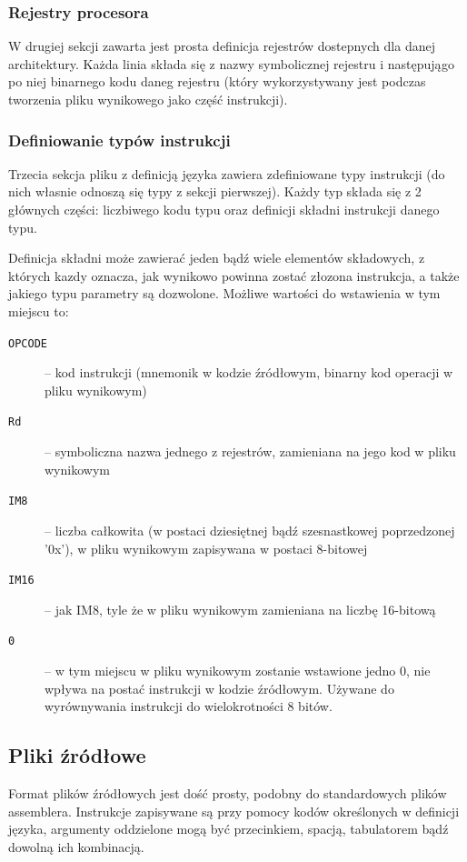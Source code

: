 \documentclass[a4paper,12pt]{report}
\begin{document}
\subsubsection{Rejestry procesora}

W drugiej sekcji zawarta jest prosta definicja rejestrów dostepnych dla danej architektury. Każda linia składa się z nazwy symbolicznej rejestru i następujągo po niej binarnego kodu daneg rejestru (który wykorzystywany jest podczas tworzenia pliku wynikowego jako część instrukcji).

\subsubsection{Definiowanie typów instrukcji}

Trzecia sekcja pliku z definicją języka zawiera zdefiniowane typy instrukcji (do nich własnie odnoszą się typy z sekcji pierwszej). Każdy typ składa się z 2 głównych części: liczbiwego kodu typu oraz definicji składni instrukcji danego typu.

Definicja składni może zawierać jeden bądź wiele elementów składowych, z których kazdy oznacza, jak wynikowo powinna zostać złozona instrukcja, a także jakiego typu parametry są dozwolone. Możliwe wartości do wstawienia w tym miejscu to:
\begin{description}
  \item[\tt{OPCODE}] -- kod instrukcji (mnemonik w kodzie źródłowym, binarny kod operacji w pliku wynikowym)
  \item[\tt{Rd}] -- symboliczna nazwa jednego z rejestrów, zamieniana na jego kod w pliku wynikowym
  \item[\tt{IM8}] -- liczba całkowita (w postaci dziesiętnej bądź szesnastkowej poprzedzonej '0x'), w pliku wynikowym zapisywana w postaci 8-bitowej
  \item[\tt{IM16}] -- jak IM8, tyle że w pliku wynikowym zamieniana na liczbę 16-bitową
  \item[\tt{0}] -- w tym miejscu w pliku wynikowym zostanie wstawione jedno 0, nie wpływa na postać instrukcji w kodzie źródłowym. Używane do wyrównywania instrukcji do wielokrotności 8 bitów.
\end{description}

\subsection{Pliki źródłowe}

Format plików źródłowych jest dość prosty, podobny do standardowych plików assemblera. Instrukcje zapisywane są przy pomocy kodów określonych w definicji języka, argumenty oddzielone mogą być przecinkiem, spacją, tabulatorem bądź dowolną ich kombinacją. 
\end{document}
